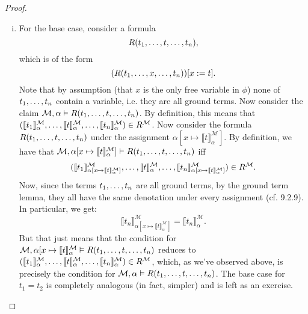 \begin{enumerate}[\thesection.1]
\begin{proof}
\begin{enumerate}[(i)]
              \item  For the base case,
                consider a formula \[R(t_1, \mathellipsis,t,
                  \mathellipsis, t_n),\] which is of the
                form \[(R(t_1, \mathellipsis,x, \mathellipsis,
                  t_n))[x:=t].\] Note that by assumption (that $x$ is
                the only free variable in $\phi$) none of
                $t_1,\mathellipsis, t_n$ contain a variable, i.e. they
                are all ground terms. Now consider the claim
                $\mathcal{M},\alpha\vDash R(t_1, \mathellipsis,t,
                \mathellipsis, t_n)$. By definition, this means that
                $(\llbracket
                t_1\rrbracket^\mathcal{M}_\alpha,\mathellipsis,
                \llbracket
                t\rrbracket^\mathcal{M}_\alpha,\mathellipsis,\llbracket
                t_n\rrbracket^\mathcal{M}_\alpha)\in
                R^\mathcal{M}$. Now consider the formula $R(t_1,
                \mathellipsis, t, \mathellipsis, t_n)$  under the
                assignment $\alpha[x\mapsto \llbracket
                t\rrbracket^\mathcal{M}_\alpha]$. By definition, we
                have that $\mathcal{M}, \alpha[x\mapsto \llbracket
                t\rrbracket^\mathcal{M}_\alpha ] \vDash R(t_1,
                \mathellipsis, t, \mathellipsis, t_n)$ iff
                \[(\llbracket
                t_1\rrbracket^\mathcal{M}_{\alpha[x\mapsto \llbracket
                t\rrbracket^\mathcal{M}_\alpha]},\mathellipsis,
                \llbracket
                t\rrbracket^\mathcal{M}_\alpha,\mathellipsis,\llbracket
                t_n\rrbracket^\mathcal{M}_{\alpha[x\mapsto \llbracket
                t\rrbracket^\mathcal{M}_\alpha]})\in
                R^\mathcal{M}.\] Now, since the terms $t_1,
              \mathellipsis, t_n$ %
              are all ground terms, by the ground
              term lemma, they all have the same denotation under
              every assignment (cf. 9.2.9). In particular, we get: \[\llbracket
                t_n\rrbracket^\mathcal{M}_{\alpha[x\mapsto \llbracket
                t\rrbracket^\mathcal{M}_\alpha]}=\llbracket
                t_n\rrbracket^\mathcal{M}_{\alpha}.\]
              But that just means that the condition for $\mathcal{M},
              \alpha[x\mapsto \llbracket 
                t\rrbracket^\mathcal{M}_\alpha\vDash R(t_1,
                \mathellipsis, t, \mathellipsis, t_n)$ reduces to
                $(\llbracket
                t_1\rrbracket^\mathcal{M}_\alpha,\mathellipsis,
                \llbracket
                t\rrbracket^\mathcal{M}_\alpha,\mathellipsis,\llbracket
                t_n\rrbracket^\mathcal{M}_\alpha)\in
                R^\mathcal{M}$, which, as we've observed above, is
                precisely the condition for
                $\mathcal{M},\alpha\vDash R(t_1, \mathellipsis,t,
                \mathellipsis, t_n)$. The base case for $t_1=t_2$ is
                completely analogous (in fact, simpler) and is left as
                an exercise. 


\end{enumerate}
\end{proof}
\end{enumerate}
